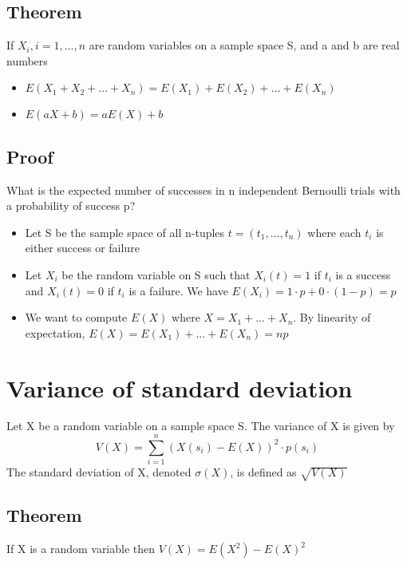 \documentclass{article}[18pt]
\begin{document}
\subsection{Theorem}
If $X_i, i=1,...,n$ are random variables on a sample space S, and a and b are real numbers
\begin{itemize}
	\item $E \left( X _ { 1 } + X _ { 2 } + \ldots + X _ { n } \right) = E \left( X _ { 1 } \right) + E \left( X _ { 2 } \right) + \ldots + E \left( X _ { n } \right)$
	\item $E ( a X + b ) = a E ( X ) + b$
\end{itemize}
\subsection{Proof}
What is the expected number of successes in n independent Bernoulli trials with a probability of success p?
\begin{itemize}
	\item Let S be the sample space of all n-tuples $t=(t_1,...,t_n)$ where each $t_i$ is either success or failure
	\item Let $X_i$ be the random variable on S such that $X_i(t)=1$ if $t_i$ is a success and $X_i(t)=0$ if $t_i$ is a failure. We have $E(X_i)=1\cdot p+0\cdot(1-p)=p$
	\item We want to compute $E(X)$ where $X=X_1+...+X_n$. By linearity of expectation, $E(X)=E(X_1)+...+E(X_n)=np$
\end{itemize}
\section{Variance of standard deviation}
Let X be a random variable on a sample space S. The variance of X is given by
$$V ( X ) = \sum _ { i = 1 } ^ { n } \left( X \left( s _ { i } \right) - E ( X ) \right) ^ { 2 } \cdot p \left( s _ { i } \right)$$
The standard deviation of X, denoted $\sigma(X)$, is defined as $\sqrt{V(X)}$
\subsection{Theorem}
If X is a random variable then $V(X)=E(X^2)-E(X)^2$
\end{document}

